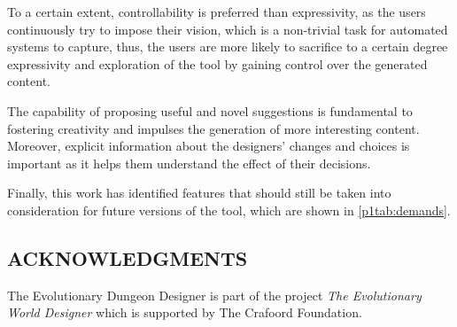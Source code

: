 To a certain extent, controllability is preferred than expressivity, as the users continuously try to impose their vision, which is a non-trivial task for automated systems to capture, thus, the users are more likely to sacrifice to a certain degree expressivity and exploration of the tool by gaining control over the generated content. 

The capability of proposing useful and novel suggestions is fundamental to fostering creativity and impulses the generation of more interesting content. Moreover, explicit information about the designers’ changes and choices is important as it helps them understand the effect of their decisions. 

Finally, this work has identified features that should still be taken into consideration for future versions of the tool, which are shown in \cref{p1tab:demands}.

\subsection*{ACKNOWLEDGMENTS}
The Evolutionary Dungeon Designer is part of the project \textit{The Evolutionary World Designer} which is supported by The Crafoord Foundation.


% 
